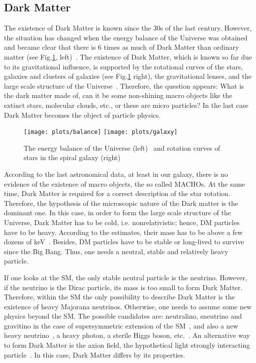 \documentclass{cernyrep}
\begin{document}
\subsection{Dark Matter}
The existence of Dark Matter is known since the 30s of the last century. However, the situation has changed when the energy balance of the Universe was obtained and became clear that there is 6 times as much of  Dark Matter  than ordinary matter (see Fig.\ref{balance}, left)~\cite{WMAP}. The existence of  Dark Matter, which is known so far due to its gravitational influence, is supported by the rotational curves of the stars, galaxies and clusters of galaxies (see Fig.\ref{balance} right), the gravitational lenses, and the large scale structure of the Universe~\cite{Kolb}. 
Therefore, the question appears: What is the dark matter made of, can it be some non-shining macro objects like the extinct stars, molecular clouds, etc., or these are micro particles? In the last case Dark Matter becomes the object of particle physics. 
\begin{figure}[ht]
\begin{center}
\leavevmode
\texttt{[image: plots/balance]}\hspace{0.6cm}
\texttt{[image: plots/galaxy]}
\end{center}\caption{The energy balance of the Universe (left)~\cite{balance} and rotation curves of stars in the spiral galaxy (right)~\cite{rotation}}
\label{balance}
\end{figure}

According to the last astronomical data, at least in our galaxy, there is no evidence of the existence of macro objects, the so called MACHOs. At the same time, Dark Matter is required for a correct description of the star rotation. Therefore,  the hypothesis of the microscopic nature of the Dark matter is the dominant one. 
In this case, in order to form the large scale structure of the Universe, Dark Matter has to be cold, i.e. nonrelativistic; hence, DM particles have to be heavy. According to the estimates, their mass has to be above a few dozens of keV~\cite{coldDM}. Besides, DM particles have to be stable or long-lived to survive since the Big Bang. Thus, one needs a neutral, stable and relatively heavy particle.

If one looks at the SM, the only stable neutral particle is the neutrino. However, if the neutrino is the Dirac particle, its mass is too small to form Dark Matter. Therefore, within the SM the only possibility to describe Dark Matter is the existence of heavy Majorana neutrinos. Otherwise, one needs to assume some new physics beyond the SM. The possible candidates are: 
neutralino, sneutrino and gravitino in the case of supersymmetric extension of the SM~\cite{abun},  and also a new heavy neutrino~\cite{Canetti}, a heavy photon, a sterile Higgs boson, etc.~\cite{Feng}. An alternative way to form Dark Matter is the axion field, the hypothetical light strongly interacting particle~\cite{axionDM}. In this case, Dark Matter differs by its properties. 
\end{document}
